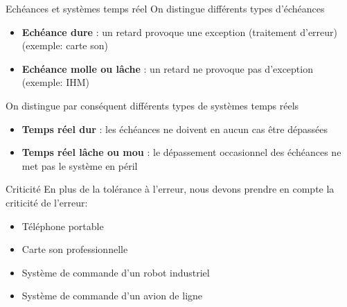 \begin{frame}{Echéances et systèmes temps réel}
  On distingue différents types d'échéances
  \begin{itemize}
  \item  \textbf{Echéance dure}  :  un retard  provoque une  exception
    (traitement d'erreur) (exemple:  carte son)
  \item \textbf{Echéance molle  ou lâche} : un retard  ne provoque pas
    d'exception (exemple: IHM)
  \end{itemize}

  On distingue par conséquent différents types de systèmes temps réels
  \begin{itemize}
  \item \textbf{Temps  réel dur} :  les échéances ne doivent  en aucun
    cas  être  dépassées 
  \item \textbf{Temps réel lâche  ou mou} : le dépassement occasionnel
    des échéances ne met pas  le système en péril
  \end{itemize}
\end{frame}

\begin{frame}{Criticité}
  En plus de la tolérance à l'erreur, nous devons prendre en compte la
  criticité de l'erreur:
  \begin{itemize} 
  \item Téléphone portable
  \item Carte son professionnelle
  \item Système de commande d'un robot industriel
  \item Système de commande d'un avion de ligne
  \end{itemize} 
\end{frame}

